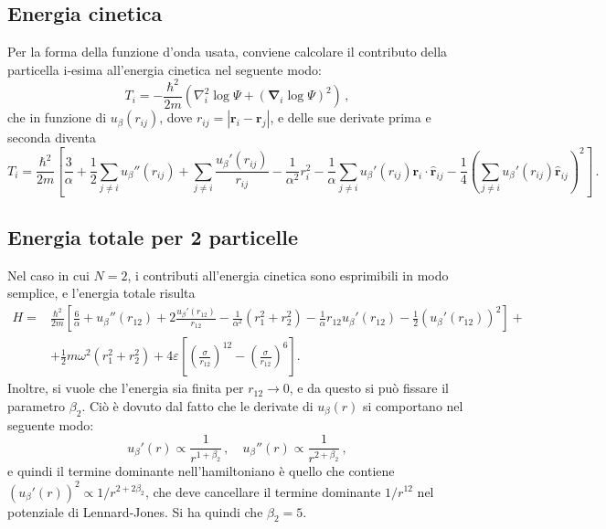 \documentclass[a4paper, titlepage]{article}
\begin{document}
\subsection{Energia cinetica}
Per la forma della funzione d'onda usata, conviene calcolare il contributo della particella i-esima all'energia cinetica nel seguente modo:
\[
T_i = -\frac{\hbar^2}{2m}\left(\nabla_i^2\log\Psi + (\boldsymbol{\nabla}_i\log\Psi)^2\right)\, ,
\]
che in funzione di $u_\beta(r_{ij})$, dove $r_{ij} = |\mathbf{r}_i - \mathbf{r}_j|$, e delle sue derivate prima e seconda diventa
\[
T_i = \frac{\hbar^2}{2m}
\left[
\frac{3}{\alpha} + 
\frac{1}{2}\sum_{j\neq i} u_\beta''(r_{ij}) + 
\sum_{j\neq i} \frac{u_\beta'(r_{ij})}{r_{ij}} -
\frac{1}{\alpha^2}r_i^2 - 
\frac{1}{\alpha} \sum_{j\neq i} u_\beta'(r_{ij}) \mathbf{r}_i \cdot \hat{\mathbf{r}}_{ij} - 
\frac{1}{4}\left(\sum_{j\neq i} u_\beta'(r_{ij}) \hat{\mathbf{r}}_{ij}\right)^2
\right]\, .
\]

\subsection{Energia totale per 2 particelle}
Nel caso in cui $N = 2$, i contributi all'energia cinetica sono esprimibili in modo semplice, e l'energia totale risulta
\begin{equation}
    \begin{split}
    H = &\frac{\hbar^2}{2m}
    \left[
    \frac{6}{\alpha} +
    u_\beta''(r_{12}) +
    2\frac{u_\beta'(r_{12})}{r_{12}} -
    \frac{1}{\alpha^2}(r_1^2 + r_2^2) - 
    \frac{1}{\alpha}r_{12}u_\beta'(r_{12}) - 
    \frac{1}{2}(u_\beta'(r_{12}))^2
    \right] + \\
    &+\frac{1}{2}m\omega^2(r_1^2 + r_2^2) + 
    4\varepsilon\left[\left(\frac{\sigma}{r_{12}}\right)^{12} - \left(\frac{\sigma}{r_{12}}\right)^{6}\right].
    \end{split}
\end{equation}
Inoltre, si vuole che l'energia sia finita per $r_{12}\rightarrow 0$, e da questo si può fissare il parametro $\beta_2$. Ciò è dovuto dal fatto che le derivate di $u_\beta(r)$ si comportano nel seguente modo:
\[
    u_\beta'(r) \propto \frac{1}{r^{1+\beta_2}}\, , \quad u_\beta''(r) \propto \frac{1}{r^{2+\beta_2}}\, ,
\]
e quindi il termine dominante nell'hamiltoniano è quello che contiene $(u_\beta'(r))^2 \propto 1/r^{2+2\beta_2}$, che deve cancellare il termine dominante $1/r^{12}$ nel potenziale di Lennard-Jones. Si ha quindi che $\beta_2 = 5$.
\end{document}
